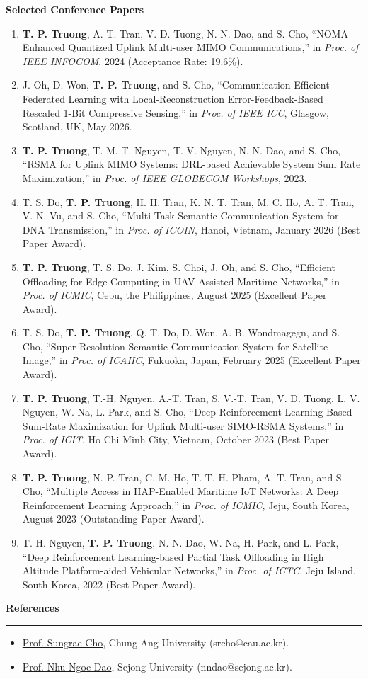 \documentclass[10pt,letterpaper]{article}
\newcommand{\sectiontitle}[1]{%
  \vspace{0.9em}
  {\large\bfseries #1}\par
  \vspace{0.25em}\hrule\vspace{0.55em}
}
\begin{document}
\textbf{Selected Conference Papers}
\begin{enumerate}[leftmargin=*, itemsep=0.22em, topsep=0.25em]
  \item \textbf{T. P. Truong}, A.-T. Tran, V. D. Tuong, N.-N. Dao, and S. Cho, ``NOMA-Enhanced Quantized Uplink Multi-user MIMO Communications,'' in \textit{Proc. of IEEE INFOCOM}, 2024 (Acceptance Rate: 19.6\%).
  \item J. Oh, D. Won, \textbf{T. P. Truong}, and S. Cho, ``Communication-Efficient Federated Learning with Local-Reconstruction Error-Feedback-Based Rescaled 1-Bit Compressive Sensing,'' in \textit{Proc. of IEEE ICC}, Glasgow, Scotland, UK, May 2026.
  \item \textbf{T. P. Truong}, T. M. T. Nguyen, T. V. Nguyen, N.-N. Dao, and S. Cho, ``RSMA for Uplink MIMO Systems: DRL-based Achievable System Sum Rate Maximization,'' in \textit{Proc. of IEEE GLOBECOM Workshops}, 2023.
  \item T. S. Do, \textbf{T. P. Truong}, H. H. Tran, K. N. T. Tran, M. C. Ho, A. T. Tran, V. N. Vu, and S. Cho, ``Multi-Task Semantic Communication System for DNA Transmission,'' in \textit{Proc. of ICOIN}, Hanoi, Vietnam, January 2026 (Best Paper Award).
  \item \textbf{T. P. Truong}, T. S. Do, J. Kim, S. Choi, J. Oh, and S. Cho, ``Efficient Offloading for Edge Computing in UAV-Assisted Maritime Networks,'' in \textit{Proc. of ICMIC}, Cebu, the Philippines, August 2025 (Excellent Paper Award).
  \item T. S. Do, \textbf{T. P. Truong}, Q. T. Do, D. Won, A. B. Wondmagegn, and S. Cho, ``Super-Resolution Semantic Communication System for Satellite Image,'' in \textit{Proc. of ICAIIC}, Fukuoka, Japan, February 2025 (Excellent Paper Award).
  \item \textbf{T. P. Truong}, T.-H. Nguyen, A.-T. Tran, S. V.-T. Tran, V. D. Tuong, L. V. Nguyen, W. Na, L. Park, and S. Cho, ``Deep Reinforcement Learning-Based Sum-Rate Maximization for Uplink Multi-user SIMO-RSMA Systems,'' in \textit{Proc. of ICIT}, Ho Chi Minh City, Vietnam, October 2023 (Best Paper Award).
  \item \textbf{T. P. Truong}, N.-P. Tran, C. M. Ho, T. T. H. Pham, A.-T. Tran, and S. Cho, ``Multiple Access in HAP-Enabled Maritime IoT Networks: A Deep Reinforcement Learning Approach,'' in \textit{Proc. of ICMIC}, Jeju, South Korea, August 2023 (Outstanding Paper Award).
  \item T.-H. Nguyen, \textbf{T. P. Truong}, N.-N. Dao, W. Na, H. Park, and L. Park, ``Deep Reinforcement Learning-based Partial Task Offloading in High Altitude Platform-aided Vehicular Networks,'' in \textit{Proc. of ICTC}, Jeju Island, South Korea, 2022 (Best Paper Award).
\end{enumerate}

\sectiontitle{References}
\begin{itemize}[leftmargin=*, itemsep=0.15em, topsep=0.1em]
  \item \href{http://cau.ac.kr/~srcho/}{Prof. Sungrae Cho}, Chung-Ang University (srcho@cau.ac.kr).
  \item \href{https://nndao.github.io/}{Prof. Nhu-Ngoc Dao}, Sejong University (nndao@sejong.ac.kr).
\end{itemize}
\end{document}
